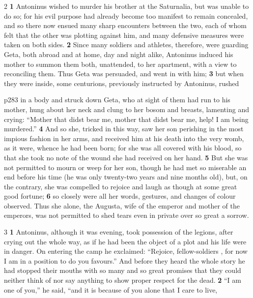 2 \textbf{1} Antoninus wished to murder his brother at the Saturnalia, but was unable to do so; for his evil purpose had already become too manifest to remain concealed, and so there now ensued many sharp encounters between the two, each of whom felt that the other was plotting against him, and many defensive measures were taken on both sides. \textbf{2} Since many soldiers and athletes, therefore, were guarding Geta, both abroad and at home, day and night alike, Antoninus induced his mother to summon them both, unattended, to her apartment, with a view to reconciling them. Thus Geta was persuaded, and went in with him; \textbf{3} but when they were inside, some centurions, previously instructed by Antoninus, rushed

p283 in a body and struck down Geta, who at sight of them had run to his mother, hung about her neck and clung to her bosom and breasts, lamenting and crying: ``Mother that didst bear me, mother that didst bear me, help! I am being murdered.'' \textbf{4} And so she, tricked in this way, saw her son perishing in the most impious fashion in her arms, and received him at his death into the very womb, as it were, whence he had been born; for she was all covered with his blood, so that she took no note of the wound she had received on her hand. \textbf{5} But she was not permitted to mourn or weep for her son, though he had met so miserable an end before his time (he was only twenty-two years and nine months old), but, on the contrary, she was compelled to rejoice and laugh as though at some great good fortune; \textbf{6} so closely were all her words, gestures, and changes of colour observed. Thus she alone, the Augusta, wife of the emperor and mother of the emperors, was not permitted to shed tears even in private over so great a sorrow.

3 \textbf{1} Antoninus, although it was evening, took possession of the legions, after crying out the whole way, as if he had been the object of a plot and his life were in danger. On entering the camp he exclaimed: ``Rejoice, fellow-soldiers , for now I am in a position to do you favours.'' And before they heard the whole story he had stopped their mouths with so many and so great promises that they could neither think of nor say anything to show proper respect for the dead. \textbf{2} ``I am one of you,'' he said, ``and it is because of you alone that I care to live,

